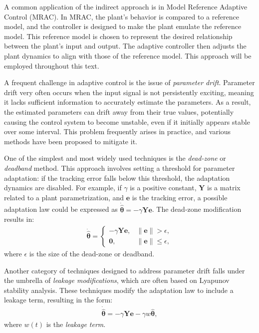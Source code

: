A common application of the indirect approach is in Model Reference Adaptive Control (MRAC). In MRAC, the plant's behavior is compared to a reference model, and the controller is designed to make the plant emulate the reference model. This reference model is chosen to represent the desired relationship between the plant's input and output. The adaptive controller then adjusts the plant dynamics to align with those of the reference model. This approach will be employed throughout this text.

A frequent challenge in adaptive control is the issue of \emph{parameter drift}. Parameter drift very often occurs when the input signal is not persistently exciting, meaning it lacks sufficient information to accurately estimate the parameters. As a result, the estimated parameters can drift away from their true values, potentially causing the control system to become unstable, even if it initially appears stable over some interval. This problem frequently arises in practice, and various methods have been proposed to mitigate it.

One of the simplest and most widely used techniques is the \emph{dead-zone} or \emph{deadband} method. This approach involves setting a threshold for parameter adaptation: if the tracking error falls below this threshold, the adaptation dynamics are disabled. For example, if $\gamma$ is a positive constant, $\mathbf{Y}$ is a matrix related to a plant parametrization, and $\mathbf{e}$ is the tracking error, a possible adaptation law could be expressed as $\dot{\widehat{\boldsymbol{\theta}}} = -\gamma\mathbf{Y}\mathbf{e}$. The dead-zone modification results in:
\begin{align*}
    \dot{\widehat{\boldsymbol{\theta}}} = \begin{cases}
        -\gamma\mathbf{Y}\mathbf{e}, &\|\mathbf{e}\| > \epsilon,\\
        \mathbf{0}, & \|\mathbf{e}\| \le \epsilon,
    \end{cases}
\end{align*}
where $\epsilon$ is the size of the dead-zone or deadband.

Another category of techniques designed to address parameter drift falls under the umbrella of \emph{leakage modifications}, which are often based on Lyapunov stability analysis. These techniques modify the adaptation law to include a leakage term, resulting in the form:
\begin{align}
    \dot{\widehat{\boldsymbol{\theta}}} = -\gamma\mathbf{Y}\mathbf{e} - \gamma w\widehat{\boldsymbol{\theta}},
\end{align}
where $w(t)$ is the \emph{leakage term}.

